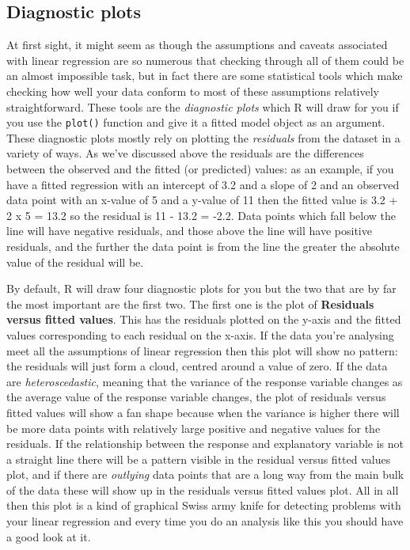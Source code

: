 \documentclass[
]{book}
\begin{document}
\hypertarget{diagnostic-plots}{%
\subsection{Diagnostic plots}\label{diagnostic-plots}}

At first sight, it might seem as though the assumptions and caveats associated with linear regression are so numerous that checking through all of them could be an almost impossible task, but in fact there are some statistical tools which make checking how well your data conform to most of these assumptions relatively straightforward. These tools are the \emph{diagnostic plots} which R will draw for you if you use the \texttt{plot()} function and give it a fitted model object as an argument. These diagnostic plots mostly rely on plotting the \emph{residuals} from the dataset in a variety of ways. As we've discussed above the residuals are the differences between the observed and the fitted (or predicted) values: as an example, if you have a fitted regression with an intercept of 3.2 and a slope of 2 and an observed data point with an x-value of 5 and a y-value of 11 then the fitted value is 3.2 + 2 x 5 = 13.2 so the residual is 11 - 13.2 = -2.2. Data points which fall below the line will have negative residuals, and those above the line will have positive residuals, and the further the data point is from the line the greater the absolute value of the residual will be.

By default, R will draw four diagnostic plots for you but the two that are by far the most important are the first two. The first one is the plot of \textbf{Residuals versus fitted values}. This has the residuals plotted on the y-axis and the fitted values corresponding to each residual on the x-axis. If the data you're analysing meet all the assumptions of linear regression then this plot will show no pattern: the residuals will just form a cloud, centred around a value of zero. If the data are \emph{heteroscedastic}, meaning that the variance of the response variable changes as the average value of the response variable changes, the plot of residuals versus fitted values will show a fan shape because when the variance is higher there will be more data points with relatively large positive and negative values for the residuals. If the relationship between the response and explanatory variable is not a straight line there will be a pattern visible in the residual versus fitted values plot, and if there are \emph{outlying} data points that are a long way from the main bulk of the data these will show up in the residuals versus fitted values plot. All in all then this plot is a kind of graphical Swiss army knife for detecting problems with your linear regression and every time you do an analysis like this you should have a good look at it.
\end{document}
